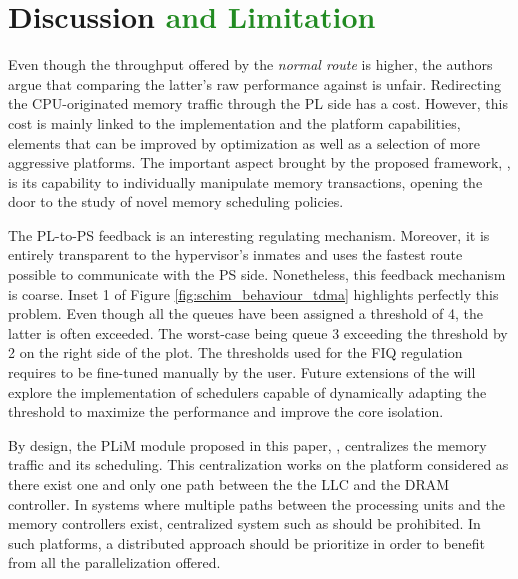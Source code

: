 \section{Discussion \textcolor{ForestGreen}{and Limitation}}
\color{red}
Even though the throughput offered by the \emph{normal route} is higher, the
authors argue that comparing the latter's raw performance against \schim is unfair.
Redirecting the CPU-originated memory traffic through the PL side has a cost.
However, this cost is mainly linked to the implementation and the platform capabilities, elements that can be improved by optimization as well as a selection of more aggressive platforms.
The important aspect brought by the proposed framework, \schim, is its capability to individually manipulate memory transactions, opening the door to the study of novel memory scheduling policies.

The PL-to-PS feedback is an interesting regulating mechanism. Moreover, it is entirely transparent to the hypervisor's inmates and uses the fastest route possible to communicate with the PS side. Nonetheless, this feedback mechanism is coarse. Inset 1 of Figure \ref{fig:schim_behaviour_tdma} highlights perfectly this problem. Even though all the queues have been assigned a threshold of 4, the latter is often exceeded. The worst-case being queue 3 exceeding the threshold by 2 on the right side of the plot.
The thresholds used for the FIQ regulation requires to be fine-tuned manually by the user. Future extensions of the \schim will explore the implementation of schedulers capable of dynamically adapting the threshold to maximize the performance and improve the core isolation.

\color{ForestGreen}

By design, the PLiM module proposed in this paper, \schim, centralizes the
memory traffic and its scheduling. This centralization works on the platform
considered as there exist one and only one path between the the LLC and the
DRAM controller. In systems where multiple paths between the processing units
and the memory controllers exist, centralized system such as \schim should be
prohibited. In such platforms, a distributed approach should be prioritize in
order to benefit from all the parallelization offered.

